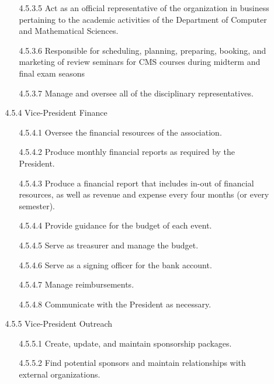 \documentclass[12pt,a4paper]{article}
\begin{document}
\begin{enumerate}
\begin{enumerate}
\begin{enumerate}
\item[4.5.3.5] Act as an official representative of the organization in business pertaining to the academic activities of the Department of Computer and Mathematical Sciences.

\item[4.5.3.6] Responsible for scheduling, planning, preparing, booking, and marketing of review seminars for CMS courses during midterm and final exam seasons

\item[4.5.3.7] Manage and oversee all of the disciplinary representatives.
\end{enumerate}

\item[4.5.4] Vice-President Finance

\begin{enumerate}
\item[4.5.4.1] Oversee the financial resources of the association.

\item[4.5.4.2] Produce monthly financial reports as required by the President.

\item[4.5.4.3] Produce a financial report that includes in-out of financial resources, as well as revenue and expense every four months (or every semester).

\item[4.5.4.4] Provide guidance for the budget of each event.

\item[4.5.4.5] Serve as treasurer and manage the budget.

\item[4.5.4.6] Serve as a signing officer for the bank account.

\item[4.5.4.7] Manage reimbursements.

\item[4.5.4.8] Communicate with the President as necessary.
\end{enumerate}

\item[4.5.5] Vice-President Outreach

\begin{enumerate}
\item[4.5.5.1] Create, update, and maintain sponsorship packages.

\item[4.5.5.2] Find potential sponsors and maintain relationships with external organizations.


\end{enumerate}
\end{enumerate}
\end{enumerate}
\end{document}
